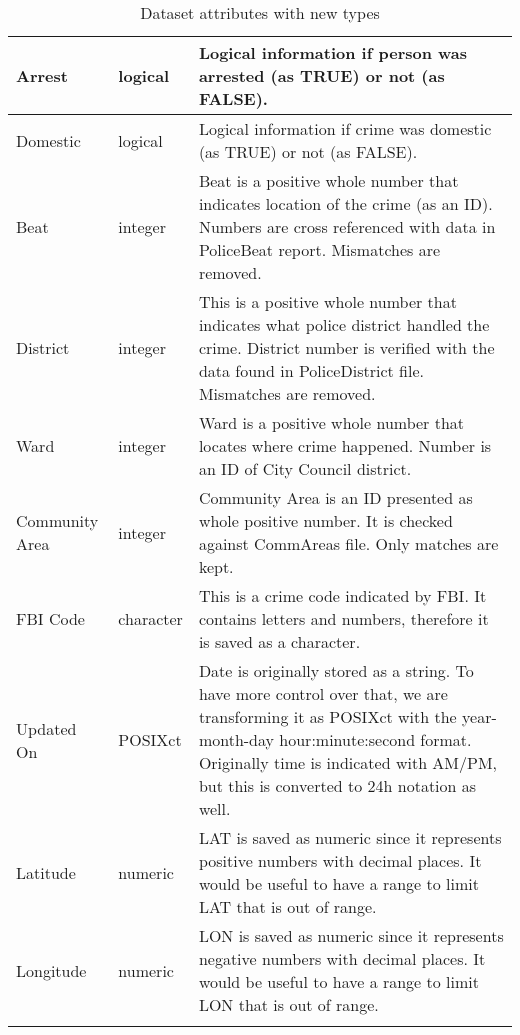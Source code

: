 \begin{center}
\begin{longtable}{|m{6em}|m{7em}|m{18em}|}
        \hline
            Arrest & 
            logical & 
            Logical information if person was arrested (as TRUE) or not (as FALSE).\\
        \hline
            Domestic & 
            logical & 
            Logical information if crime was domestic (as TRUE) or not (as FALSE).\\
        \hline
            Beat & 
            integer & 
            Beat is a positive whole number that indicates location of the crime (as an ID). Numbers are cross referenced with data in PoliceBeat report. Mismatches are removed.\\
        \hline
            District & 
            integer & 
            This is a positive whole number that indicates what police district handled the crime. District number is verified with the data found in PoliceDistrict file. Mismatches are removed.\\
        \hline
            Ward & 
            integer & 
            Ward is a positive whole number that locates where crime happened. Number is an ID of City Council district.\\
        \hline
            Community Area & 
            integer & 
            Community Area is an ID presented as whole positive number. It is checked against CommAreas file. Only matches are kept.\\
        \hline
            FBI Code & 
            character & 
            This is a crime code indicated by FBI. It contains letters and numbers, therefore it is saved as a character.\\
        \hline
            Updated On & 
            POSIXct & 
            Date is originally stored as a string. To have more control over that, we are transforming it as POSIXct with the year-month-day hour:minute:second format. Originally time is indicated with AM/PM, but this is converted to 24h notation as well.\\
        \hline
            Latitude & 
            numeric & 
            LAT is saved as numeric since it represents positive numbers with decimal places. It would be useful to have a range to limit LAT that is out of range.\\
        \hline
            Longitude & 
            numeric & 
            LON is saved as numeric since it represents negative numbers with decimal places. It would be useful to have a range to limit LON that is out of range.\\
        \hline
    \caption{Dataset attributes with new types}
\end{longtable}
\end{center}